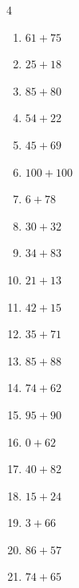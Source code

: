 \begin{multicols}{4}
\begin{enumerate}
  \item $61+75$
        \phantom{$=136$}

  \item $25+18$
        \phantom{$=43$}

  \item $85+80$
        \phantom{$=165$}

  \item $54+22$
        \phantom{$=76$}

  \item $45+69$
        \phantom{$=114$}

  \item $100+100$
        \phantom{$=200$}

  \item $6+78$
        \phantom{$=84$}

\columnbreak %

  \item $30+32$
        \phantom{$=62$}

  \item $34+83$
        \phantom{$=117$}

  \item $21+13$
        \phantom{$=34$}

  \item $42+15$
        \phantom{$=57$}

  \item $35+71$
        \phantom{$=106$}

  \item $85+88$
        \phantom{$=173$}

  \item $74+62$
        \phantom{$=136$}

  \item $95+90$
        \phantom{$=185$}

  \item $0+62$
        \phantom{$=62$}

  \item $40+82$
        \phantom{$=122$}

  \item $15+24$
        \phantom{$=39$}

  \item $3+66$
        \phantom{$=69$}

  \item $86+57$
        \phantom{$=143$}

  \item $74+65$
        \phantom{$=139$}


\end{enumerate}
\end{multicols}
